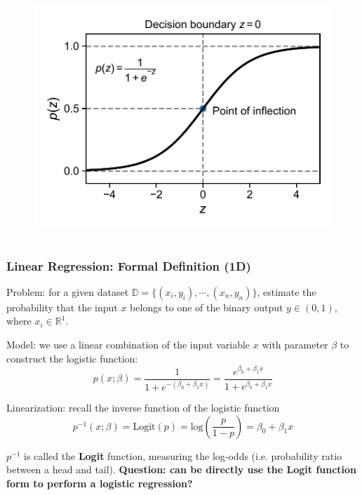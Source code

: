 \documentclass[10pt,aspectratio=169]{beamer}
\begin{document}
\begin{frame}
\begin{columns}[T]
\begin{column}{0.5\textwidth}
        \begin{figure}[t]%
          \hspace*{-0.1\textwidth}%
          \includegraphics[width=1.2\textwidth]{scripts/logistic_fun_alone.pdf}
        \end{figure}
        
      \end{column}
      
    \end{columns}
  \end{frame}

  \begin{frame}
    \frametitle{Linear Regression: Formal Definition (1D)}
    Problem: for a given dataset
    $\mathbb{D} = \{(x_{i}, y_{i}), \cdots, (x_{n}, y_{n})\}$,
    estimate the probability that the input $x$ belongs to one of the
    binary output $y \in (0, 1)$, where $x_{i} \in \mathbb{R}^{1}$.

    \vfill Model: we use a linear combination of the input variable
    $x$ with parameter $\beta$ to construct the logistic function:
    \begin{equation*}
      p(x; \beta) = \dfrac{1}{1 + e^{-(\beta_{0} + \beta_{1} x)}} = \dfrac{e^{\beta_{0} + \beta_{1} x}}{1 + e^{\beta_{0} + \beta_{1} x}}
    \end{equation*}

    \vfill Linearization: recall the inverse function of the logistic
    function
    \begin{equation*}
      p^{-1}(x; \beta) = \mathrm{Logit}(p) = \mathrm{log} (\dfrac{p}{1 - p} ) = \beta_{0} + \beta_{1} x
    \end{equation*}

    $p^{-1}$ is called the \textbf{Logit} function, measuring the
    log-odds (i.e. probability ratio between a head and tail). %
    \vfill%
    \textbf{Question: can be directly use the Logit function form to
      perform a logistic regression?}
  
  \end{frame}
\end{document}
